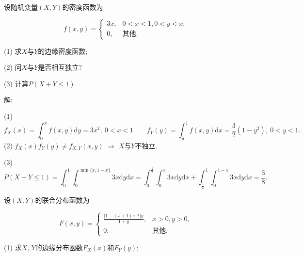 \documentclass[standard]{ExBook}
\begin{document}
\begin{qitems}
\vspace{-5em}

    \begin{bbox}
    \begin{shaded}
        \qitem
设随机变量$(X,Y)$的密度函数为
\vspace{-2em}
\begin{center}
\begin{equation}
    f(x,y)=
    \left\{
    \begin{array}{cl}
        \nonumber
        3x, &0<x<1,0<y<x,\\
        0, & \text{其他}.
    \end{array}
    \right.
\end{equation}
\end{center}
(1) 求$X$与$Y$的边缘密度函数;

(2) 问$X$与$Y$是否相互独立?

(3) 计算$P(X+Y\leq 1)$.
    \end{shaded}
    \end{bbox}

\vspace{-5em}

    \begin{bbox}
解: 

(1)
$$f_{X}(x)=\int_{0}^{x}f(x,y)\mathrm{d}y=3x^2,\ 0<x<1\qquad f_{Y}(y)=\int_{y}^{1}f(x,y)\mathrm{d}x=\frac{3}{2}(1-y^2),\ 0<y<1.$$
(2) $f_{X}(x)f_{Y}(y)\neq f_{X,Y}(x,y)$ $\Longrightarrow$ $X$与$Y$不独立.

(3)
$$P(X+Y\leq1)=\int_{0}^{1}\int_{0}^{\min\{x,1-x\}}3x\mathrm{d}y\mathrm{d}x=\int_{0}^{\frac{1}{2}}\int_{0}^{x}3x\mathrm{d}y\mathrm{d}x+\int_{\frac{1}{2}}^{1}\int_{0}^{1-x}3x\mathrm{d}y\mathrm{d}x=\frac{3}{8}.$$
    \end{bbox}

\vspace{-5em}

    \begin{bbox}
    \begin{shaded}
        \qitem
设$(X,Y)$的联合分布函数为
\vspace{-2em}
\begin{center}
\begin{equation}
    F(x,y)=
    \left\{
    \begin{array}{cl}
        \nonumber
        \displaystyle\frac{|1-(x+1)e^{-x}|y}{1+y}, & x>0, y>0,\\
        0, & \text{其他}.
    \end{array}
    \right.
\end{equation}
\end{center}
(1) 求$X$, $Y$的边缘分布函数$F_{X}(x)$和$F_{Y}(y)$;


\end{shaded}
\end{bbox}
\end{qitems}
\end{document}
